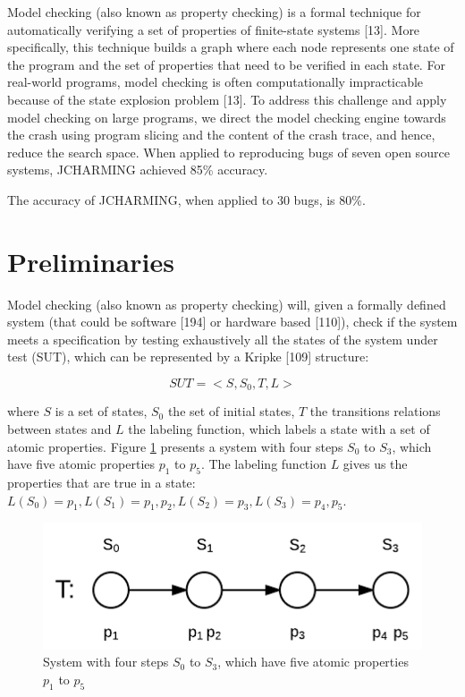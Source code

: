 \documentclass[12pt]{report}
\begin{document}
Model checking (also known as property checking) is a formal technique
for automatically verifying a set of properties of finite-state systems
{[}13{]}. More specifically, this technique builds a graph where each
node represents one state of the program and the set of properties that
need to be verified in each state. For real-world programs, model
checking is often computationally impracticable because of the state
explosion problem {[}13{]}. To address this challenge and apply model
checking on large programs, we direct the model checking engine towards
the crash using program slicing and the content of the crash trace, and
hence, reduce the search space. When applied to reproducing bugs of
seven open source systems, JCHARMING achieved 85\% accuracy.

The accuracy of JCHARMING, when applied to 30 bugs, is 80\%.

\section{\texorpdfstring{Preliminaries\label{sec:prelimenaries}}{Preliminaries}}\label{preliminaries}

Model checking (also known as property checking) will, given a formally
defined system (that could be software {[}194{]} or hardware based
{[}110{]}), check if the system meets a specification by testing
exhaustively all the states of the system under test (SUT), which can be
represented by a Kripke {[}109{]} structure:

\begin{equation}
SUT = <S, S_0, T, L>
\end{equation}

where \(S\) is a set of states, \(S_0\) the set of initial states, \(T\)
the transitions relations between states and \(L\) the labeling
function, which labels a state with a set of atomic properties. Figure
\ref{fig:mc-def} presents a system with four steps \(S_0\) to \(S_3\),
which have five atomic properties \(p_1\) to \(p_5\). The labeling
function \(L\) gives us the properties that are true in a state:
\(L(S_0) = {p_1}, L(S_1) = {p_1, p_2}, L(S_2) = {p_3}, L(S_3) = {p_4, p_5}\).

\begin{figure}[h!]
  \centering
    \includegraphics[scale=0.4]{media/chap8/mc-def.png}
    \caption{System with four steps $S_0$ to $S_3$, which have five atomic properties $p_1$ to $p_5$
    \label{fig:mc-def}}
\end{figure}
\end{document}
